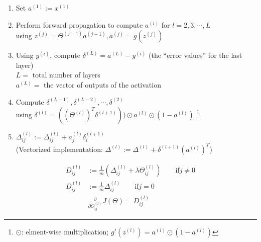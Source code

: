 \begin{enumerate}
\item
Set $a^{(1)} := x^{(1)}$
\item
Perform forward propagation to compute $a^{(l)}$ for $l=2,3, \cdots, L$\\
using $z^{(j)} = \Theta^{(j-1)}a^{(j-1)}, a^{(j)} = g(z^{(j)})$
\item
Using $y^{(i)}$, compute $\delta^{(L)} = a^{(L)}-y^{(i)}$ (the ``error values'' for the last layer)\\
$L = $ total number of layers\\
$a^{(L)} = $ the vector of outputs of the activation 
\item
Compute $\delta^{(L-1)}, \delta^{(L-2)}, \cdots, \delta^{(2)}$\\
using $\delta^{(l)} = ((\Theta^{(l)})^T \delta^{(l+1)})) \odot a^{(l)} \odot (1-a^{(l)})$ \footnote{$\odot$: elment-wise multiplication; $g'(z^{(l)}) = a^{(l)} \odot (1-a^{(l)})$}
\item
$\Delta_{ij}^{(l)} := \Delta_{ij}^{(l)} + a_j^{(l)}\delta_i^{(l+1)}$\\
(Vectorized implementation:
$\Delta^{(l)} := \Delta^{(l)} + \delta^{(l+1)}(a^{(l)})^T$)
\end{enumerate}

\begin{align}
D_{ij}^{(l)} &:= \frac{1}{m} \left(\Delta_{ij}^{(l)} + \lambda\Theta_{ij}^{(l)}\right) \qquad \text{if} j \neq 0 \nonumber\\
D_{ij}^{(l)} &:= \frac{1}{m}\Delta_{ij}^{(l)} \qquad \text{if} j = 0\\
&\frac{\partial}{\partial{\Theta_{ij}^{(l)}}} J(\Theta) =  D_{ij}^{(l)}
\end{align}

